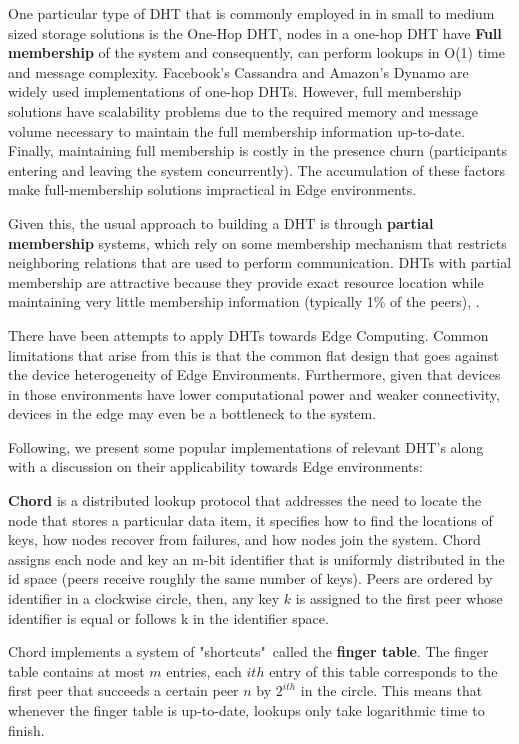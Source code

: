 One particular type of DHT that is commonly employed in in small to medium sized storage solutions is the One-Hop DHT, nodes in a one-hop DHT have \textbf{Full membership} of the system and consequently, can perform lookups in O(1) time and message complexity. Facebook's Cassandra \cite{lakshman2010cassandra} and Amazon's Dynamo \cite{decandia2007dynamo} are widely used implementations of one-hop DHTs. However, full membership solutions have scalability problems due to the required memory and message volume necessary to maintain the full membership information up-to-date. Finally, maintaining full membership is costly in the presence churn (participants entering and leaving the system concurrently). The accumulation of these factors make full-membership solutions impractical in Edge environments.

Given this, the usual approach to building a DHT is through \textbf{partial membership} systems, which rely on some membership mechanism that restricts neighboring relations that are used to perform communication. DHTs with partial membership are attractive because they provide exact resource location while maintaining very little membership information (typically 1\% of the peers), . 

There have been attempts to apply DHTs towards Edge Computing. Common limitations that arise from this is that the common flat design that goes against the device heterogeneity of Edge Environments. Furthermore, given that devices in those environments have lower computational power and weaker connectivity, devices in the edge may even be a bottleneck to the system. 

Following, we present some popular implementations of relevant DHT's along with a discussion on their applicability towards Edge environments:

\textbf{Chord} \cite{stoica2003chord} is a distributed lookup protocol that addresses the need to locate the node that stores a particular data item, it specifies how to find the locations of keys, how nodes recover from failures, and how nodes join the system. Chord assigns each node and key an m-bit identifier that is uniformly distributed in the id space (peers receive roughly the same number of keys). Peers are ordered by identifier in a clockwise circle, then, any key \(k\) is assigned to the first peer whose identifier is equal or follows k in the identifier space. 

Chord implements a system of "shortcuts"\ called the \textbf{finger table}. The finger table contains at most \(m\) entries, each $ith$ entry of this table corresponds to the first peer that succeeds a certain peer \(n\) by \(2^{ith}\) in the circle. This means that whenever the finger table is up-to-date, lookups only take logarithmic time to finish. 

